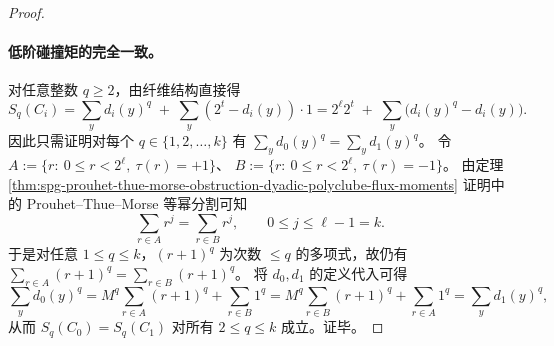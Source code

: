 \begin{proof}
\paragraph{低阶碰撞矩的完全一致。}
对任意整数 \(q\ge 2\)，由纤维结构直接得
\[
S_q(C_i)
=\sum_{y} d_i(y)^q\;+\;\sum_{y}(2^t-d_i(y))\cdot 1
=2^{\ell}2^{t}\;+\;\sum_{y}\bigl(d_i(y)^q-d_i(y)\bigr).
\]
因此只需证明对每个 \(q\in\{1,2,\dots,k\}\) 有
\(
\sum_{y}d_0(y)^q=\sum_{y}d_1(y)^q
\)。
令
\(
A:=\{r:\ 0\le r<2^{\ell},\ \tau(r)=+1\}
\)、
\(
B:=\{r:\ 0\le r<2^{\ell},\ \tau(r)=-1\}
\)。
由定理 \ref{thm:spg-prouhet-thue-morse-obstruction-dyadic-polyclube-flux-moments} 证明中的 Prouhet--Thue--Morse 等幂分割可知
\[
\sum_{r\in A} r^j=\sum_{r\in B} r^j,\qquad 0\le j\le \ell-1=k.
\]
于是对任意 \(1\le q\le k\)，\((r+1)^q\) 为次数 \(\le q\) 的多项式，故仍有
\(
\sum_{r\in A}(r+1)^q=\sum_{r\in B}(r+1)^q
\)。
将 \(d_0,d_1\) 的定义代入可得
\[
\sum_{y} d_0(y)^q
=M^q\sum_{r\in A}(r+1)^q+\sum_{r\in B}1^q
=M^q\sum_{r\in B}(r+1)^q+\sum_{r\in A}1^q
=\sum_{y} d_1(y)^q,
\]
从而 \(S_q(C_0)=S_q(C_1)\) 对所有 \(2\le q\le k\) 成立。证毕。
\end{proof}

\endinput
